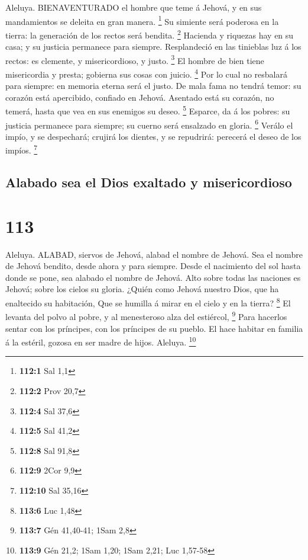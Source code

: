  Aleluya. BIENAVENTURADO el hombre que teme á Jehová, y en
sus mandamientos se deleita en gran manera. \footnote{\textbf{112:1} Sal
  1,1}  Su simiente será poderosa en la tierra: la
generación de los rectos será bendita. \footnote{\textbf{112:2} Prov
  20,7}  Hacienda y riquezas hay en su casa; y su justicia
permanece para siempre.  Resplandeció en las tinieblas luz á
los rectos: es clemente, y misericordioso, y justo. \footnote{\textbf{112:4}
  Sal 37,6}  El hombre de bien tiene misericordia y presta;
gobierna sus cosas con juicio. \footnote{\textbf{112:5} Sal 41,2}
 Por lo cual no resbalará para siempre: en memoria eterna
será el justo.  De mala fama no tendrá temor: su corazón
está apercibido, confiado en Jehová.  Asentado está su
corazón, no temerá, hasta que vea en sus enemigos su deseo. \footnote{\textbf{112:8}
  Sal 91,8}  Esparce, da á los pobres: su justicia permanece
para siempre; su cuerno será ensalzado en gloria. \footnote{\textbf{112:9}
  2Cor 9,9}  Verálo el impío, y se despechará; crujirá los
dientes, y se repudrirá: perecerá el deseo de los impíos. \footnote{\textbf{112:10}
  Sal 35,16}

\hypertarget{alabado-sea-el-dios-exaltado-y-misericordioso}{%
\subsection{Alabado sea el Dios exaltado y
misericordioso}\label{alabado-sea-el-dios-exaltado-y-misericordioso}}

\hypertarget{section-112}{%
\section{113}\label{section-112}}

 Aleluya. ALABAD, siervos de Jehová, alabad el nombre de
Jehová.  Sea el nombre de Jehová bendito, desde ahora y para
siempre.  Desde el nacimiento del sol hasta donde se pone,
sea alabado el nombre de Jehová.  Alto sobre todas las
naciones es Jehová; sobre los cielos su gloria.  ¿Quién como
Jehová nuestro Dios, que ha enaltecido su habitación,  Que
se humilla á mirar en el cielo y en la tierra? \footnote{\textbf{113:6}
  Luc 1,48}  El levanta del polvo al pobre, y al menesteroso
alza del estiércol, \footnote{\textbf{113:7} Gén 41,40-41; 1Sam 2,8}
 Para hacerlos sentar con los príncipes, con los príncipes
de su pueblo.  El hace habitar en familia á la estéril,
gozosa en ser madre de hijos. Aleluya. \footnote{\textbf{113:9} Gén
  21,2; 1Sam 1,20; 1Sam 2,21; Luc 1,57-58}

